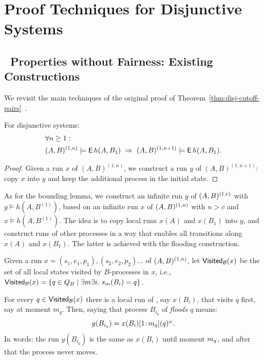 \section{Proof Techniques for Disjunctive Systems} \label{gua:sec:proofs-disj}

\subsection{\LTLmX\ Properties without Fairness: Existing Constructions}
\label{gua:sec:ideas-disj-nofair}

We revisit the main techniques
of the original proof of Theorem~\ref{thm:disj-cutoff-pairs}~\cite{Emerson00}. 

\begin{lemma} \label{disj:le:NonFairDisjunctiveMono}
    For disjunctive systems:
    \begin{align*}
    &\forall n \geq 1:\\
    &(A,B)^{(1,n)} \models \operatorname{\mathsf{E}} h(A,B_1)
    \ \Rightarrow \
    (A,B)^{(1,n+1)} \models \operatorname{\mathsf{E}} h(A,B_1).
    \end{align*}
\end{lemma}
\begin{proof}
Given a run $x$ of $(A,B)^{(1,n)}$,
we construct a run $y$ of $(A,B)^{(1,n+1)}$: 
copy $x$ into $y$ and keep the additional process in the initial state.
\end{proof}


As for the bounding lemma, we construct an infinite run $y$ of $(A,B)^{(1,c)}$ 
with $y \models h(A,B^{(1)})$, 
based on an infinite run $x$ of $(A,B)^{(1,n)}$ with $n>c$ and $x \models h(A,B^{(1)})$. 
The idea is to copy local runs $x(A)$ and $x(B_1)$ into $y$, 
and construct runs of other processes in a way 
that enables all transitions along $x(A)$ and $x(B_1)$. 
The latter is achieved with the flooding construction.

Given a run $x = (s_1,e_1,p_1), (s_2,e_2,p_2) \ldots$ of $(A,B)^{(1,n)}$, let
$\mathsf{Visited}_{\mathcal{B}}(x)$ be the set of all local states visited by $B$-processes in $x$,
i.e., $\mathsf{Visited}_{\mathcal{B}}(x) = \{ q \in Q_B \mid \exists m \exists i.\ s_m(B_i) = q \}$. 

For every $q \in \mathsf{Visited}_{\mathcal{B}}(x)$ there is a local run of \largesys, say $x(B_i)$,
that visits $q$ first, say at moment $m_q$. Then, saying that process 
$B_{i_q}$ of \cutoffsys \emph{floods $q$} means:
$$y(B_{i_q}) = x(B_i)[{1}\!:\!{m_q}](q)^\omega.$$ 
In words: the run $y(B_{i_q})$ is the same as $x(B_i)$ until moment $m_q$,
and after that the process never moves.

